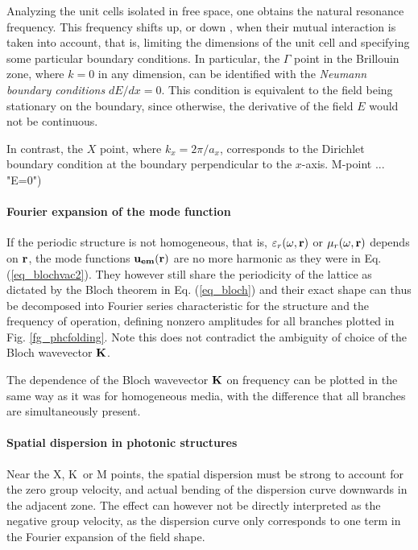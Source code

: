 \label{hopping}
Analyzing the unit cells isolated in free space, one obtains the natural resonance frequency.
This frequency shifts up, or down \cite[p. 75]{klingshirn2007semiconductor}, when their mutual interaction is taken into account, that is, limiting the dimensions of the unit cell and specifying some particular boundary conditions.
In particular, the $\Gamma$ point in the Brillouin zone, where $k = 0$ in any dimension, can be identified with the \textit{Neumann boundary conditions} $dE/dx = 0$. This condition is equivalent to the field being stationary on the boundary, since  otherwise, the derivative of the field $E$ would not be continuous. %

In contrast, the $X$ point, where $k_x = 2\pi/a_x$, corresponds to the Dirichlet boundary condition at the boundary perpendicular to the $x$-axis.
M-point ... "E=0") %

\paragraph{Fourier expansion of the mode function}%
If the periodic structure is not homogeneous, that is, $\varepsilon_r(\omega,{\mathbf{r}})$ or $\mu_r(\omega,{\mathbf{r}})$ depends on ${\mathbf{r}}$, the mode functions $\mathbf{u_{em}}({\mathbf{r}})$ are no more harmonic as they were in Eq. (\ref{eq_blochvac2}). They  however still share the periodicity of the lattice as dictated by the Bloch theorem in Eq. (\ref{eq_bloch}) and their exact shape can thus be decomposed into Fourier series
characteristic for the structure and the frequency of operation, defining nonzero amplitudes for all branches plotted in Fig. \ref{fg_phcfolding}. Note this does not contradict the ambiguity of choice of the Bloch wavevector ${\mathbf{K}}$.

The dependence of the Bloch wavevector ${\mathbf{K}}$ on frequency can be plotted in the same way as it was for homogeneous media, with the difference that all branches are simultaneously present. %

\paragraph{Spatial dispersion in photonic structures} %
Near the X, K~or M points, the spatial dispersion must be strong to account for the zero group velocity, and actual bending of the dispersion curve downwards in the adjacent zone. The effect can however not be directly interpreted as the negative group velocity, as the dispersion curve only corresponds to one term in the Fourier expansion of the field shape.  
